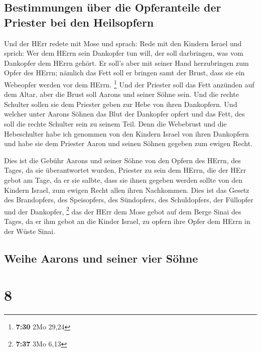 \hypertarget{bestimmungen-uxfcber-die-opferanteile-der-priester-bei-den-heilsopfern}{%
\subsection{Bestimmungen über die Opferanteile der Priester bei den
Heilsopfern}\label{bestimmungen-uxfcber-die-opferanteile-der-priester-bei-den-heilsopfern}}

 Und der HErr redete mit Mose und sprach: 
Rede mit den Kindern Israel und sprich: Wer dem HErrn sein Dankopfer tun
will, der soll darbringen, was vom Dankopfer dem HErrn gehört.
 Er soll's aber mit seiner Hand herzubringen zum Opfer
des HErrn; nämlich das Fett soll er bringen samt der Brust, dass sie ein
Webeopfer werden vor dem HErrn. \footnote{\textbf{7:30} 2Mo 29,24}
 Und der Priester soll das Fett anzünden auf dem Altar,
aber die Brust soll Aarons und seiner Söhne sein.  Und
die rechte Schulter sollen sie dem Priester geben zur Hebe von ihren
Dankopfern.  Und welcher unter Aarons Söhnen das Blut der
Dankopfer opfert und das Fett, des soll die rechte Schulter sein zu
seinem Teil.  Denn die Webebrust und die Hebeschulter
habe ich genommen von den Kindern Israel von ihren Dankopfern und habe
sie dem Priester Aaron und seinen Söhnen gegeben zum ewigen Recht.

 Dies ist die Gebühr Aarons und seiner Söhne von den
Opfern des HErrn, des Tages, da sie überantwortet wurden, Priester zu
sein dem HErrn,  die der HErr gebot am Tage, da er sie
salbte, dass sie ihnen gegeben werden sollte von den Kindern Israel, zum
ewigen Recht allen ihren Nachkommen.  Dies ist das Gesetz
des Brandopfers, des Speisopfers, des Sündopfers, des Schuldopfers, der
Füllopfer und der Dankopfer, \footnote{\textbf{7:37} 3Mo 6,13}
 das der HErr dem Mose gebot auf dem Berge Sinai des
Tages, da er ihm gebot an die Kinder Israel, zu opfern ihre Opfer dem
HErrn in der Wüste Sinai.

\hypertarget{weihe-aarons-und-seiner-vier-suxf6hne}{%
\subsection{Weihe Aarons und seiner vier
Söhne}\label{weihe-aarons-und-seiner-vier-suxf6hne}}

\hypertarget{section-7}{%
\section{8}\label{section-7}}

